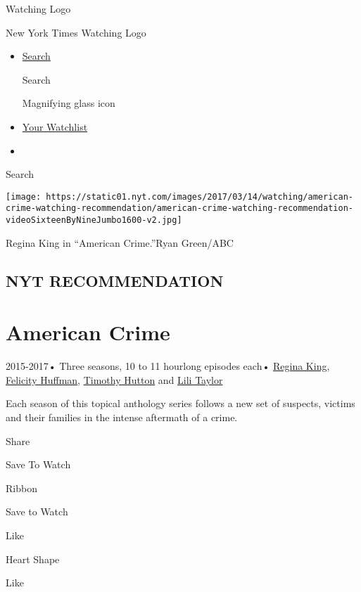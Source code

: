\href{/watching}{}

Watching Logo

New York Times Watching Logo

\begin{itemize}
\item
  \href{/watching/search}{Search}

  Search

  Magnifying glass icon
\item
  \href{/watching/watchlist}{Your Watchlist}
\item
\end{itemize}

Search

\texttt{[image: https://static01.nyt.com/images/2017/03/14/watching/american-crime-watching-recommendation/american-crime-watching-recommendation-videoSixteenByNineJumbo1600-v2.jpg]}

Regina King in ``American Crime.''Ryan Green/ABC

\hypertarget{nyt-recommendation}{%
\subsection{NYT RECOMMENDATION}\label{nyt-recommendation}}

\hypertarget{american-crime}{%
\section{American Crime}\label{american-crime}}

2015-2017• Three seasons, 10 to 11 hourlong episodes each•
\href{/watching/search?q=Regina\%20King\&actor=regina-king}{Regina
King},
\href{/watching/search?q=Felicity\%20Huffman\&actor=felicity-huffman}{Felicity
Huffman},
\href{/watching/search?q=Timothy\%20Hutton\&actor=timothy-hutton}{Timothy
Hutton} and
\href{/watching/search?q=Lili\%20Taylor\&actor=lili-taylor}{Lili Taylor}

Each season of this topical anthology series follows a new set of
suspects, victims and their families in the intense aftermath of a
crime.

Share

Save To Watch

Ribbon

Save to Watch

Like

Heart Shape

Like

